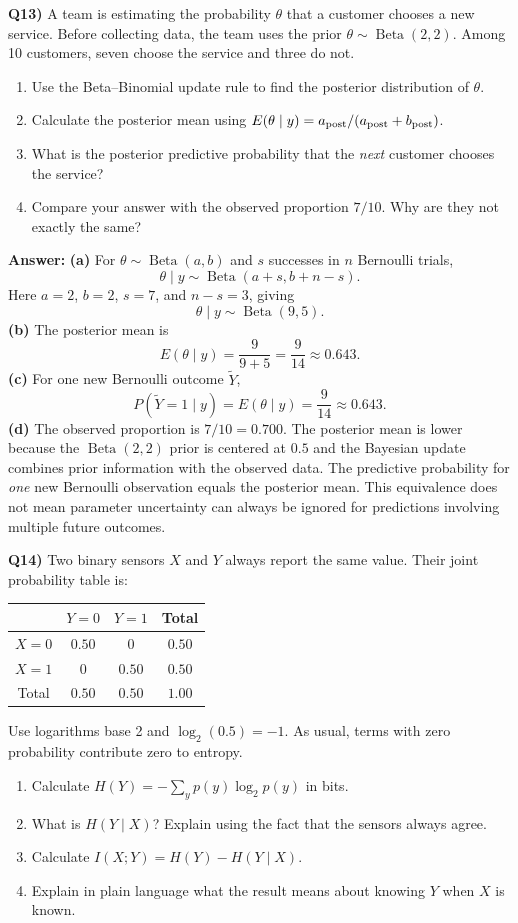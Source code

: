 \documentclass[12pt]{article}
\newenvironment{solution}{\par\smallskip\begingroup\color{blue}\noindent\textbf{Answer: }\smallskip}{\par\endgroup\medskip}
\newcommand{\question}[2]{\vspace{0.7em}\noindent\textbf{Q#1)}}
\begin{document}
\question{13}{}
A team is estimating the probability $\theta$ that a customer chooses a new service. Before collecting data, the team uses the prior $\theta\sim\operatorname{Beta}(2,2)$. Among 10 customers, seven choose the service and three do not.
\begin{enumerate}[label=(\alph*),nosep]
\item Use the Beta--Binomial update rule to find the posterior distribution of $\theta$.
\item Calculate the posterior mean using $E(\theta\mid y)=a_{\rm post}/(a_{\rm post}+b_{\rm post})$.
\item What is the posterior predictive probability that the \emph{next} customer chooses the service?
\item Compare your answer with the observed proportion $7/10$. Why are they not exactly the same?
\end{enumerate}

\begin{solution}
\textbf{(a)} For $\theta\sim\operatorname{Beta}(a,b)$ and $s$ successes in $n$ Bernoulli trials,
\[\theta\mid y\sim\operatorname{Beta}(a+s,b+n-s).\]
Here $a=2$, $b=2$, $s=7$, and $n-s=3$, giving
\[\boxed{\theta\mid y\sim\operatorname{Beta}(9,5)}.\]
\textbf{(b)} The posterior mean is
\[\boxed{E(\theta\mid y)=\frac{9}{9+5}=\frac{9}{14}\approx0.643}.\]
\textbf{(c)} For one new Bernoulli outcome $\widetilde Y$,
\[\boxed{P(\widetilde Y=1\mid y)=E(\theta\mid y)=\frac{9}{14}\approx0.643}.\]
\textbf{(d)} The observed proportion is $7/10=0.700$. The posterior mean is lower because the $\operatorname{Beta}(2,2)$ prior is centered at $0.5$ and the Bayesian update combines prior information with the observed data.
The predictive probability for \emph{one} new Bernoulli observation equals the posterior mean. This equivalence does not mean parameter uncertainty can always be ignored for predictions involving multiple future outcomes.
\end{solution}

\question{14}{}
Two binary sensors $X$ and $Y$ always report the same value. Their joint probability table is:
\begin{center}
\begin{tabular}{c|cc|c}
 & $Y=0$ & $Y=1$ & Total\\
\hline
$X=0$ & $0.50$ & $0$ & $0.50$\\
$X=1$ & $0$ & $0.50$ & $0.50$\\
\hline
Total & $0.50$ & $0.50$ & $1.00$
\end{tabular}
\end{center}
Use logarithms base 2 and $\log_2(0.5)=-1$. As usual, terms with zero probability contribute zero to entropy.
\begin{enumerate}[label=(\alph*)]
\item Calculate $H(Y)=-\sum_y p(y)\log_2p(y)$ in bits.
\item What is $H(Y\mid X)$? Explain using the fact that the sensors always agree.
\item Calculate $I(X;Y)=H(Y)-H(Y\mid X)$.
\item Explain in plain language what the result means about knowing $Y$ when $X$ is known.
\end{enumerate}
\end{document}
